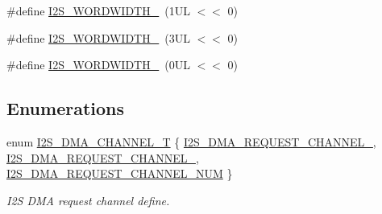 \begin{DoxyCompactItemize}
\item 
\#define \hyperlink{group__I2S__17XX__40XX_ga4d016baad0fba07da20a6410470c71d3}{I2\+S\+\_\+\+W\+O\+R\+D\+W\+I\+D\+T\+H\+\_}~(1\+U\+L $<$$<$ 0)
\item 
\#define \hyperlink{group__I2S__17XX__40XX_ga683d81436e91c1631bdd5947ee78489b}{I2\+S\+\_\+\+W\+O\+R\+D\+W\+I\+D\+T\+H\+\_}~(3\+U\+L $<$$<$ 0)
\item 
\#define \hyperlink{group__I2S__17XX__40XX_ga17cb1a91d5be4e7afad486ead6d2980d}{I2\+S\+\_\+\+W\+O\+R\+D\+W\+I\+D\+T\+H\+\_}~(0\+U\+L $<$$<$ 0)
\end{DoxyCompactItemize}
\subsection*{Enumerations}
\begin{DoxyCompactItemize}
\item 
enum \hyperlink{group__I2S__17XX__40XX_gac04c1583101ddd661886d9677683421b}{I2\+S\+\_\+\+D\+M\+A\+\_\+\+C\+H\+A\+N\+N\+E\+L\+\_\+T} \{ \hyperlink{group__I2S__17XX__40XX_ggac04c1583101ddd661886d9677683421ba549b2d28b5da72f6185d736f5fed51c1}{I2\+S\+\_\+\+D\+M\+A\+\_\+\+R\+E\+Q\+U\+E\+S\+T\+\_\+\+C\+H\+A\+N\+N\+E\+L\+\_}, 
\hyperlink{group__I2S__17XX__40XX_ggac04c1583101ddd661886d9677683421ba65eabb50f670f1dcae7b3c790f088e16}{I2\+S\+\_\+\+D\+M\+A\+\_\+\+R\+E\+Q\+U\+E\+S\+T\+\_\+\+C\+H\+A\+N\+N\+E\+L\+\_}, 
\hyperlink{group__I2S__17XX__40XX_ggac04c1583101ddd661886d9677683421bab9921186ab93fee889b2074d508b88ce}{I2\+S\+\_\+\+D\+M\+A\+\_\+\+R\+E\+Q\+U\+E\+S\+T\+\_\+\+C\+H\+A\+N\+N\+E\+L\+\_\+\+N\+UM}
 \}\begin{DoxyCompactList}\small\item\em I2S D\+MA request channel define. \end{DoxyCompactList}
\end{DoxyCompactItemize}
